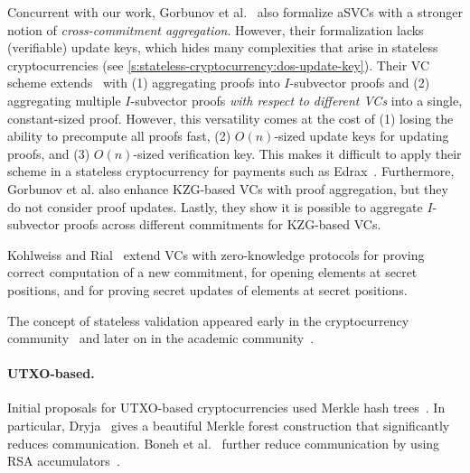 Concurrent with our work, Gorbunov et al.~\cite{GRWZ20} also formalize aSVCs with a stronger notion of \textit{cross-commitment aggregation}.
However, their formalization lacks (verifiable) update keys, which hides many complexities that arise in stateless cryptocurrencies (see \cref{s:stateless-cryptocurrency:dos-update-key}).
Their VC scheme extends~\cite{LY10} with (1) aggregating proofs into $I$-subvector proofs and (2) aggregating multiple $I$-subvector proofs \textit{with respect to different VCs} into a single, constant-sized proof.
However, this versatility comes at the cost of (1) losing the ability to precompute all proofs fast, (2) $O(n)$-sized update keys for updating proofs, and (3) $O(n)$-sized verification key.
This makes it difficult to apply their scheme in a stateless cryptocurrency for payments such as Edrax~\cite{CPZ18}.
Furthermore, Gorbunov et al. also enhance KZG-based VCs with proof aggregation, but they do not consider proof updates.
Lastly, they show it is possible to aggregate $I$-subvector proofs across different commitments for KZG-based VCs.

Kohlweiss and Rial~\cite{KR13} extend VCs with zero-knowledge protocols for proving correct computation of a new commitment, for opening elements at secret positions, and for proving secret updates of elements at secret positions.


The concept of stateless validation appeared early in the cryptocurrency community~\cite{Miller12,Todd16,Buterin17} and later on in the academic community~\cite{RMCI17,Dryja19,CPZ18,BBF19,GRWZ20}.
\ifNotCameraReady\paragraph{UTXO-based.}\fi
Initial proposals for UTXO-based cryptocurrencies used Merkle hash trees~\cite{Miller12,Todd16,Dryja19,CPZ18}.
In particular, Dryja~\cite{Dryja19} gives a beautiful Merkle forest construction that significantly reduces communication.
Boneh et al.~\cite{BBF19} further reduce communication by using RSA accumulators\ifNotCameraReady~\cite{Bd93,LLX07}\fi.

